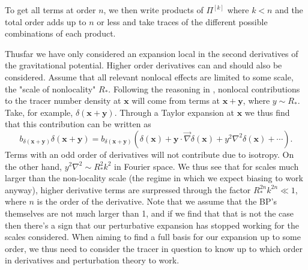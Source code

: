 \documentclass[11pt]{article}
\DeclareRobustCommand{\d}{\ifmmode\text{d}\else d\fi}
\newcommand{\br}[1]{\ensuremath{\left( #1 \right)}}
\newcommand{\sbr}[1]{\ensuremath{\left[ #1 \right]}}
\begin{document}
To get all terms at order $n$, we then write products of $\Pi^{[k]}$ where $k<n$ and the total order adds up to $n$ or less and take traces of the different possible combinations of each product. %

Thusfar we have only considered an expansion local in the second derivatives of the gravitational potential. Higher order derivatives can and should also be considered. Assume that all relevant nonlocal effects are limited to some scale, the "scale of nonlocality" $R_*$. Following the reasoning in \cite{Schmidt2013_clustering}, nonlocal contributions to the tracer number density at $\mathbf x$ will come from terms at $\mathbf x + \mathbf y$, where $y \sim R_*$. Take, for example, $\delta(\mathbf x + \mathbf y)$. Through a Taylor expansion at $\mathbf x$ we thus find that this contribution can be written as
$$
b_{\delta(\mathbf x + \mathbf y)}\delta(\mathbf x+\mathbf y) = b_{\delta(\mathbf x + \mathbf y)}(\delta(\mathbf x) + \mathbf y \cdot\vec \nabla \delta(\mathbf x) + y^2\nabla^2\delta(\mathbf x) + \cdots). 
$$
Terms with an odd order of derivatives will not contribute due to isotropy. On the other hand, $y^2\nabla^2\sim R_*^2 k^2$ in Fourier space. We thus see that for scales much larger than the non-locality scale (the regime in which we expect biasing to work anyway), higher derivative terms are surpressed through the factor $R_*^{2n}k^{2n}\ll 1$, where $n$ is the order of the derivative. Note that we assume that the BP's themselves are not much larger than 1, and if we find that that is not the case then there's a sign that our perturbative expansion has stopped working for the scales considered. When aiming to find a full basis for our expansion up to some order, we thus need to consider the tracer in question to know up to which order in derivatives and perturbation theory to work. %

\end{document}

